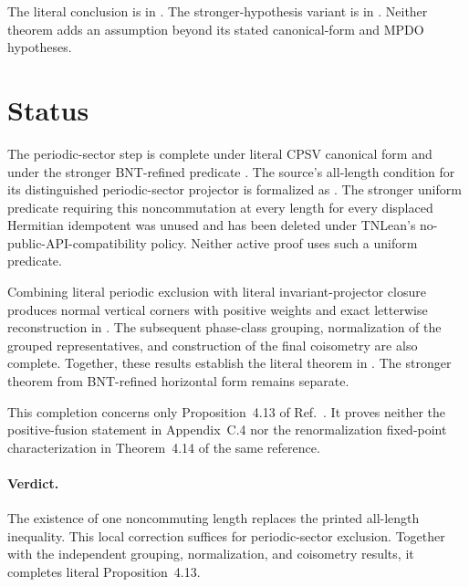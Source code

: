 \documentclass{article}
\begin{document}
The literal conclusion is
 in
. The stronger-hypothesis
variant is
 in
. Neither theorem adds an assumption
beyond its stated canonical-form and MPDO hypotheses.

\section{Status}

The periodic-sector step is complete under literal CPSV canonical form and
under the stronger BNT-refined predicate
. The source's all-length condition for its
distinguished periodic-sector projector is formalized as
. The stronger uniform predicate requiring this noncommutation at every length
for every displaced Hermitian idempotent was unused and has been deleted under
TNLean's no-public-API-compatibility policy. Neither active proof uses such a
uniform predicate.

Combining literal periodic exclusion with literal invariant-projector closure
produces normal vertical corners with positive weights and exact letterwise
reconstruction in
.
The subsequent phase-class grouping, normalization of the grouped
representatives, and construction of the final coisometry are also complete.
Together, these results establish the literal theorem
 in
. The stronger theorem from
BNT-refined horizontal form remains separate.

This completion concerns only Proposition~4.13 of
Ref.~\cite{Cirac2016MPDO_arXiv}. It proves neither the positive-fusion
statement in Appendix~C.4 nor the renormalization fixed-point characterization
in Theorem~4.14 of the same reference.

\paragraph{Verdict.}
The existence of one noncommuting length replaces the printed all-length
inequality. This local correction suffices for periodic-sector exclusion.
Together with the independent grouping, normalization, and coisometry results,
it completes literal Proposition~4.13.



\end{document}
